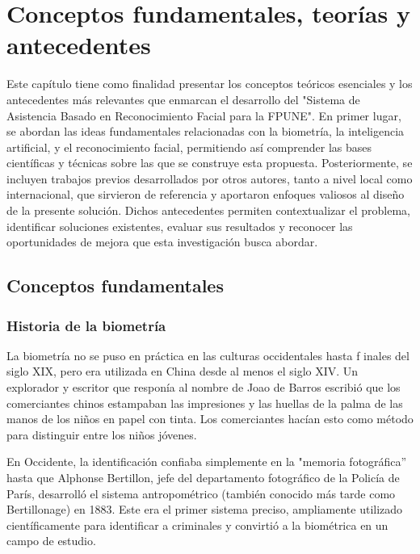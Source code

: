 \fancyhead{}
\fancyfoot{}
\newtheorem{teorema}{Teorema}
\cfoot{\thepage}



\chapter{Conceptos fundamentales, teorías y antecedentes}
Este capítulo tiene como finalidad presentar los conceptos teóricos esenciales y los antecedentes más relevantes que enmarcan el desarrollo del "Sistema de Asistencia Basado en Reconocimiento Facial para la FPUNE". En primer lugar, se abordan las ideas fundamentales relacionadas con la biometría, la inteligencia artificial, y el reconocimiento facial, permitiendo así comprender las bases científicas y técnicas sobre las que se construye esta propuesta.
Posteriormente, se incluyen trabajos previos desarrollados por otros autores, tanto a nivel local como internacional, que sirvieron de referencia y aportaron enfoques valiosos al diseño de la presente solución. Dichos antecedentes permiten contextualizar el problema, identificar soluciones existentes, evaluar sus resultados y reconocer las oportunidades de mejora que esta investigación busca abordar.
\section{Conceptos fundamentales}
\subsection{Historia de la biometría}
La biometría no se puso en práctica en las culturas occidentales hasta f
inales del siglo XIX, pero era utilizada en China desde al menos el siglo XIV.
Un explorador y escritor que responía al nombre de Joao de Barros escribió
que los comerciantes chinos estampaban las impresiones y las huellas de la
palma de las manos de los niños en papel con tinta. Los comerciantes hacían
esto como método para distinguir entre los niños jóvenes.

En Occidente, la identificación confiaba simplemente en la "memoria fotográfica” hasta que Alphonse Bertillon, jefe del departamento fotográfico de
la Policía de París, desarrolló el sistema antropométrico (también conocido
más tarde como Bertillonage) en 1883. Este era el primer sistema preciso, ampliamente utilizado científicamente para identificar a criminales y convirtió a
la biométrica en un campo de estudio.

